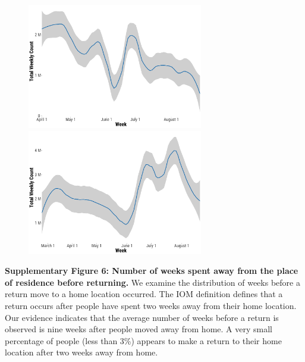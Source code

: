 \documentclass[
  11pt,
]{article}
\begin{document}
\begin{figure}[h]

\begin{minipage}{0.50\linewidth}

\includegraphics[width=3.02083in,height=\textheight,keepaspectratio]{../outputs/sm/ukr_wide_returns_iom.png}

\end{minipage}%
%
\begin{minipage}{0.50\linewidth}

\includegraphics[width=3.02083in,height=\textheight,keepaspectratio]{../outputs/sm/ukr_wide_returns2_doug.png}

\end{minipage}%

\end{figure}%

\newpage

\textbf{Supplementary Figure 6: Number of weeks spent away from the
place of residence before returning.} We examine the distribution of
weeks before a return move to a home location occurred. The IOM
definition defines that a return occurs after people have spent two
weeks away from their home location. Our evidence indicates that the
average number of weeks before a return is observed is nine weeks after
people moved away from home. A very small percentage of people (less
than 3\%) appears to make a return to their home location after two
weeks away from home.
\end{document}
